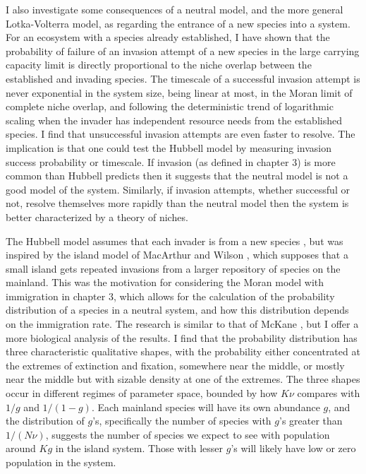 I also investigate some consequences of a neutral model, and the more general Lotka-Volterra model, as regarding the entrance of a new species into a system. 
For an ecosystem with a species already established, I have shown that the probability of failure of an invasion attempt of a new species in the large carrying capacity limit is directly proportional to the niche overlap between the established and invading species. 
The timescale of a successful invasion attempt is never exponential in the system size, being linear at most, in the Moran limit of complete niche overlap, and following the deterministic trend of logarithmic scaling when the invader has independent resource needs from the established species. 
I find that unsuccessful invasion attempts are even faster to resolve. 
The implication is that one could test the Hubbell model by measuring invasion success probability or timescale. 
If invasion (as defined in chapter 3) is more common than Hubbell predicts then it suggests that the neutral model is not a good model of the system. %
Similarly, if invasion attempts, whether successful or not, resolve themselves more rapidly than the neutral model then the system is better characterized by a theory of niches. 

The Hubbell model assumes that each invader is from a new species \cite{Hubbell2001}, but was inspired by the island model of MacArthur and Wilson \cite{MacArthur1967a}, which supposes that a small island gets repeated invasions from a larger repository of species on the mainland. 
This was the motivation for considering the Moran model with immigration in chapter 3, which allows for the calculation of the probability distribution of a species in a neutral system, and how this distribution depends on the immigration rate. %
The research is similar to that of McKane \cite{McKane2004}, but I offer a more biological analysis of the results. 
I find that the probability distribution has three characteristic qualitative shapes, with the probability either concentrated at the extremes of extinction and fixation, somewhere near the middle, or mostly near the middle but with sizable density at one of the extremes. 
The three shapes occur in different regimes of parameter space, bounded by how $K\nu$ compares with $1/g$ and $1/(1-g)$. 
Each mainland species will have its own abundance $g$, and the distribution of $g$'s, specifically the number of species with $g$'s greater than $1/(N\nu)$, suggests the number of species we expect to see with population around $K g$ in the island system. 
Those with lesser $g$'s will likely have low or zero population in the system. 

